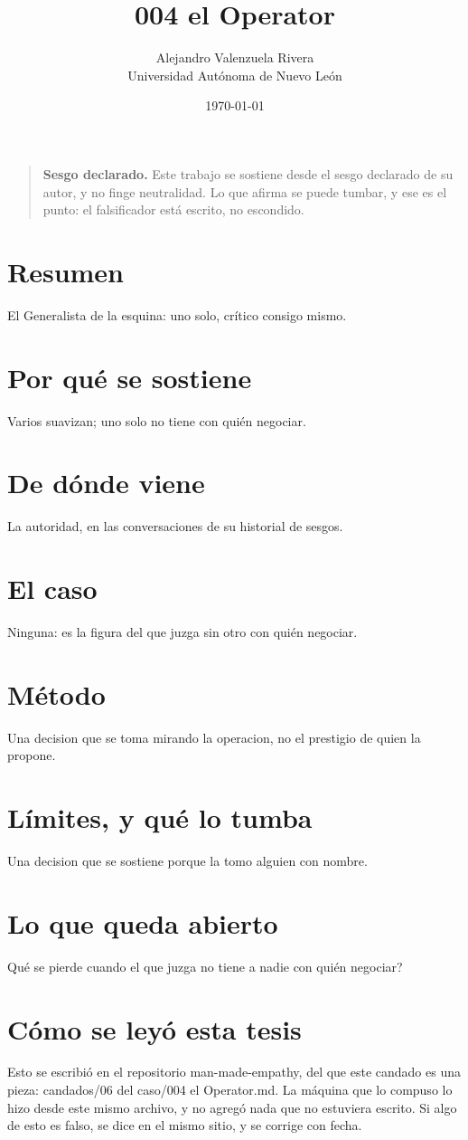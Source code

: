 \documentclass[11pt,a4paper]{article}
\title{004 el Operator}
\author{Alejandro Valenzuela Rivera\\\small Universidad Autónoma de Nuevo León}
\date{\today}
\begin{document}
\maketitle

\begin{quote}
\textbf{Sesgo declarado.} Este trabajo se sostiene desde el sesgo declarado de su autor, y no finge neutralidad. Lo que afirma se puede tumbar, y ese es el punto: el falsificador está escrito, no escondido.
\end{quote}

\section*{Resumen}
El Generalista de la esquina: uno solo, crítico consigo mismo.

\section{Por qué se sostiene}
Varios suavizan; uno solo no tiene con quién negociar.

\section{De dónde viene}
La autoridad, en las conversaciones de su historial de sesgos.

\section{El caso}
Ninguna: es la figura del que juzga sin otro con quién negociar.

\section{Método}
Una decision que se toma mirando la operacion, no el prestigio de quien la propone.

\section{Límites, y qué lo tumba}
Una decision que se sostiene porque la tomo alguien con nombre.

\section{Lo que queda abierto}
\textquestiondown{}Qué se pierde cuando el que juzga no tiene a nadie con quién negociar?

\section*{Cómo se leyó esta tesis}
Esto se escribió en el repositorio man-made-empathy, del que este candado es una pieza: candados/06 del caso/004 el Operator.md. La máquina que lo compuso lo hizo desde este mismo archivo, y no agregó nada que no estuviera escrito. Si algo de esto es falso, se dice en el mismo sitio, y se corrige con fecha.
\end{document}
